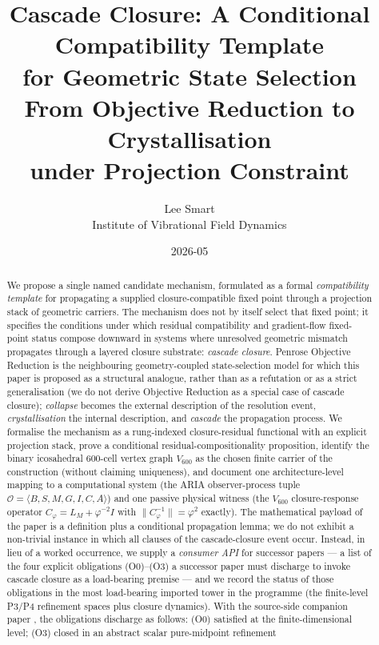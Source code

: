 \documentclass[11pt]{article}
\title{Cascade Closure: A Conditional Compatibility Template\\
for Geometric State Selection\\[0.4em]
\large From Objective Reduction to Crystallisation\\
under Projection Constraint}
\author{Lee Smart \\ Institute of Vibrational Field Dynamics}
\date{2026-05}
\theoremstyle{definition}
\newcommand{\pphi}{\varphi}
\newcommand{\Ocal}{\mathcal{O}}
\newcommand{\Vsub}{V_{600}}
\newcommand{\Cphi}{C_{\pphi}}
\begin{document}
\maketitle

\begin{abstract}
We propose a single named candidate mechanism, formulated as a formal
\emph{compatibility template} for propagating a supplied
closure-compatible fixed point through a projection stack of
geometric carriers. The mechanism does not by itself select that
fixed point; it specifies the conditions under which residual
compatibility and gradient-flow fixed-point status compose downward in
systems where unresolved geometric mismatch propagates through a
layered closure substrate:
\emph{cascade closure}. Penrose Objective Reduction is the
neighbouring geometry-coupled state-selection model for which this
paper is proposed as a structural analogue, rather than as a
refutation or as a strict generalisation (we do not derive
Objective Reduction as a special case of cascade closure); \emph{collapse}
becomes the external description of the resolution event,
\emph{crystallisation} the internal description, and \emph{cascade}
the propagation process. We formalise the mechanism as a rung-indexed
closure-residual functional with an explicit projection stack, prove
a conditional residual-compositionality proposition, identify the binary
icosahedral 600-cell vertex graph $\Vsub$ as the chosen finite carrier
of the construction (without claiming uniqueness), and document one
architecture-level mapping to a computational system (the ARIA
observer-process tuple
$\Ocal = \langle B, S, M, G, I, C, A\rangle$) and one passive physical
witness (the $\Vsub$ closure-response operator $\Cphi = L_M + \pphi^{-2} I$
with $\|\Cphi^{-1}\| = \pphi^2$ exactly). The mathematical payload of
the paper is a definition plus a conditional propagation lemma; we
do not exhibit a non-trivial instance in which all clauses of the
cascade-closure event occur. Instead, in lieu of a worked occurrence,
we supply a \emph{consumer API} for successor papers --- a list of
the four explicit obligations (O0)--(O3) a successor paper must
discharge to invoke cascade closure as a load-bearing premise ---
and we record the status of those obligations in the most
load-bearing imported tower in the programme (the finite-level P3/P4
refinement spaces plus closure dynamics). With the source-side
companion paper \cite{CascadeRefinementCompat}, the obligations
discharge as follows: (O0) satisfied at the finite-dimensional
level; (O3) closed in an abstract scalar pure-midpoint refinement

\end{abstract}
\end{document}
